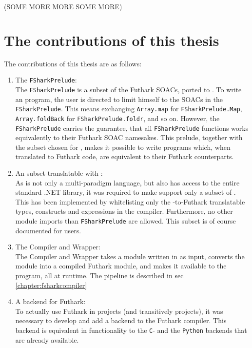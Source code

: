 (SOME MORE MORE SOME MORE)

\clearpage
\section*{The contributions of this thesis}
The contributions of this thesis are as follows:
\begin{enumerate}
\item The \texttt{FSharkPrelude}:\\
  The \texttt{FSharkPrelude} is a subset of the Futhark SOACs, ported to
  \fsharp{}. To write an \fshark{} program, the user is directed to limit
  himself to the SOACs in the \texttt{FSharkPrelude}. This means exchanging
  \texttt{Array.map} for \texttt{FSharkPrelude.Map}, \texttt{Array.foldBack} for
  \texttt{FSharkPrelude.foldr}, and so on.
  However, the \texttt{FSharkPrelude} carries the guarantee, that all
  \texttt{FSharkPrelude} functions works equivalently to their Futhark SOAC namesakes. 
  This prelude, together with the \fsharp{} subset chosen for \fshark{}, makes
  it possible to write \fsharp{} programs which, when translated to Futhark
  code, are equivalent to their Futhark counterparts.

\item An \fsharp{} subset translatable with \fshark{}:\\
  As \fsharp{} is not only a multi-paradigm language, but also has access to the
  entire standard .NET library, it was required to make \fshark{} support only a
  subset of \fsharp{}. This has been implemented by whitelisting only the
  \fsharp{}-to-Futhark translatable types, constructs and expressions in the \fshark{}
  compiler. Furthermore, no other module imports than \texttt{FSharkPrelude} are allowed. 
  This subset is of course documented for users.

\item The \fshark{} Compiler and Wrapper:\\
  The \fshark{} Compiler and Wrapper takes a module written in \fshark{} as
  input, converts the \fshark{} module into a compiled Futhark \csharp{} module,
  and makes it available to the \fsharp{} program, all at runtime.
  The pipeline is described in sec \ref{chapter:fsharkcompiler}

\item A \csharp{} backend for Futhark:\\
  To actually use Futhark in \csharp{} projects (and transitively \fsharp{}
  projects), it was necessary to develop and add a \csharp{} backend to
  the Futhark compiler. This backend is equivalent in functionality to
  the \texttt{C}- and the \texttt{Python} backends that are already available.

\end{enumerate}

